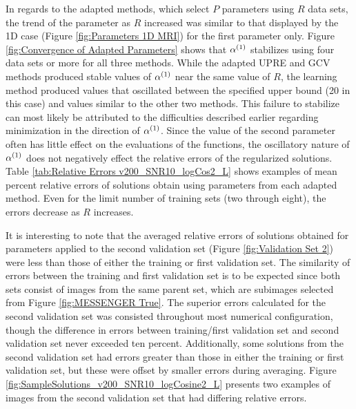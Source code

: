 \documentclass[12pt]{article}
\begin{document}
In regards to the adapted methods, which select $P$ parameters using $R$ data sets, the trend of the parameter as $R$ increased was similar to that displayed by the 1D case (Figure \ref{fig:Parameters 1D MRI}) for the first parameter only. Figure \ref{fig:Convergence of Adapted Parameters} shows that $\alpha^{(1)}$ stabilizes using four data sets or more for all three methods. While the adapted UPRE and GCV methods produced stable values of $\alpha^{(1)}$ near the same value of $R$, the learning method produced values that oscillated between the specified upper bound (20 in this case) and values similar to the other two methods. This failure to stabilize can most likely be attributed to the difficulties described earlier regarding minimization in the direction of $\alpha^{(1)}$. Since the value of the second parameter often has little effect on the evaluations of the functions, the oscillatory nature of $\alpha^{(1)}$ does not negatively effect the relative errors of the regularized solutions. Table \ref{tab:Relative Errors v200_SNR10_logCos2_L} shows examples of mean percent relative errors of solutions obtain using parameters from each adapted method. Even for the limit number of training sets (two through eight), the errors decrease as $R$ increases. \par 
It is interesting to note that the averaged relative errors of solutions obtained for parameters applied to the second validation set (Figure \ref{fig:Validation Set 2}) were less than those of either the training or first validation set. The similarity of errors between the training and first validation set is to be expected since both sets consist of images from the same parent set, which are subimages selected from Figure \ref{fig:MESSENGER True}. The superior errors calculated for the second validation set was consisted throughout most numerical configuration, though the difference in errors between training/first validation set and second validation set never exceeded ten percent. Additionally, some solutions from the second validation set had errors greater than those in either the training or first validation set, but these were offset by smaller errors during averaging. Figure \ref{fig:SampleSolutions_v200_SNR10_logCosine2_L} presents two examples of images from the second validation set that had differing relative errors. 
\end{document}

